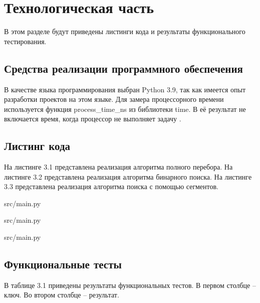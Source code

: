\chapter{Технологическая часть}
В этом разделе будут приведены листинги кода и результаты функционального тестирования.

\section{Средства реализации программного обеспечения}
В качестве языка программирования выбран Python 3.9, так как имеется опыт разработки проектов на этом языке.
Для замера процессорного времени используется функция process\_time\_ns из библиотеки time. 
В её результат не включается время, когда процессор не выполняет задачу \cite{python}.

\section{Листинг кода}
\FloatBarrier
На листинге 3.1 представлена реализация алгоритма полного перебора.
На листинге 3.2 представлена реализация алгоритма бинарного поиска. 
На листинге 3.3 представлена реализация алгоритма поиска с помощью сегментов.

\begin{lstinputlisting}[language=Python, caption=Реализация алгоритма полного перебора, linerange={9-23}, 
	basicstyle=\footnotesize\ttfamily, frame=single,breaklines=true]{src/main.py}
\end{lstinputlisting}
\FloatBarrier

\FloatBarrier
\begin{lstinputlisting}[language=Python, caption=Реализация алгоритма бинарного поиска, linerange={24-61}, 
	basicstyle=\footnotesize\ttfamily, frame=single, breaklines=true]{src/main.py}
\end{lstinputlisting}
\FloatBarrier

\FloatBarrier
\begin{lstinputlisting}[language=Python, caption=Реализация алгоритма поиска с помощью сегментов, linerange={63-108}, 
	basicstyle=\footnotesize\ttfamily, frame=single, breaklines=true]{src/main.py}
\end{lstinputlisting}
\FloatBarrier

\section{Функциональные тесты}
В таблице 3.1 приведены результаты функциональных тестов. 
В первом столбце -- ключ.
Во втором столбце -- результат.

